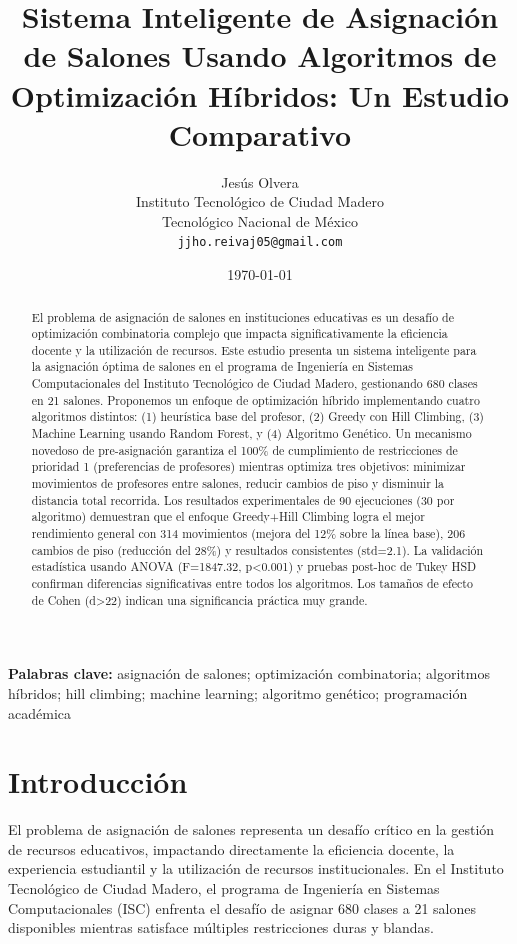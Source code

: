 \documentclass[12pt,a4paper]{article}
\title{\textbf{Sistema Inteligente de Asignación de Salones Usando Algoritmos de Optimización Híbridos: Un Estudio Comparativo}}
\author{
  Jesús Olvera \\
  \small Instituto Tecnológico de Ciudad Madero \\
  \small Tecnológico Nacional de México \\
  \small \texttt{jjho.reivaj05@gmail.com}
}
\date{\today}
\begin{document}
\maketitle

\begin{abstract}
El problema de asignación de salones en instituciones educativas es un desafío de optimización combinatoria complejo que impacta significativamente la eficiencia docente y la utilización de recursos. Este estudio presenta un sistema inteligente para la asignación óptima de salones en el programa de Ingeniería en Sistemas Computacionales del Instituto Tecnológico de Ciudad Madero, gestionando 680 clases en 21 salones. Proponemos un enfoque de optimización híbrido implementando cuatro algoritmos distintos: (1) heurística base del profesor, (2) Greedy con Hill Climbing, (3) Machine Learning usando Random Forest, y (4) Algoritmo Genético. Un mecanismo novedoso de pre-asignación garantiza el 100\% de cumplimiento de restricciones de prioridad 1 (preferencias de profesores) mientras optimiza tres objetivos: minimizar movimientos de profesores entre salones, reducir cambios de piso y disminuir la distancia total recorrida. Los resultados experimentales de 90 ejecuciones (30 por algoritmo) demuestran que el enfoque Greedy+Hill Climbing logra el mejor rendimiento general con 314 movimientos (mejora del 12\% sobre la línea base), 206 cambios de piso (reducción del 28\%) y resultados consistentes (std=2.1). La validación estadística usando ANOVA (F=1847.32, p<0.001) y pruebas post-hoc de Tukey HSD confirman diferencias significativas entre todos los algoritmos. Los tamaños de efecto de Cohen (d>22) indican una significancia práctica muy grande.
\end{abstract}

\noindent\textbf{Palabras clave:} asignación de salones; optimización combinatoria; algoritmos híbridos; hill climbing; machine learning; algoritmo genético; programación académica

\section{Introducción}

El problema de asignación de salones representa un desafío crítico en la gestión de recursos educativos, impactando directamente la eficiencia docente, la experiencia estudiantil y la utilización de recursos institucionales. En el Instituto Tecnológico de Ciudad Madero, el programa de Ingeniería en Sistemas Computacionales (ISC) enfrenta el desafío de asignar 680 clases a 21 salones disponibles mientras satisface múltiples restricciones duras y blandas.
\end{document}
